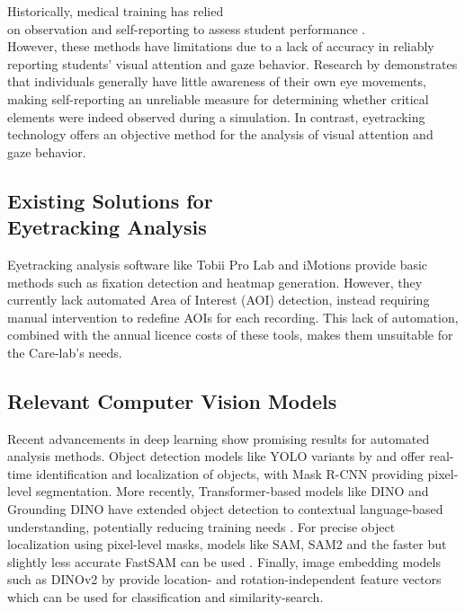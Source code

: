 \documentclass[english]{hogent-article}
\begin{document}
Historically, medical training has relied\\ on observation and self-reporting to assess student performance \autocite{Pauszek2023}.\\
However, these methods have limitations due to a lack of accuracy in reliably reporting students' visual attention and gaze behavior. 
Research by \textcite{Clarke2017} demonstrates that individuals generally have little awareness of their own eye movements, 
making self-reporting an unreliable measure for determining whether critical elements were indeed observed during a simulation. 
In contrast, eyetracking technology offers an objective method for the analysis of visual attention and gaze behavior.

\subsection{Existing Solutions for\\ Eyetracking Analysis}

Eyetracking analysis software like Tobii Pro Lab \textcite{Tobii2025a} and iMotions \textcite{iMotions2025} provide basic methods such as fixation detection and heatmap generation.
However, they currently lack automated Area of Interest (AOI) detection, instead requiring manual intervention to redefine AOIs for each recording.
This lack of automation, combined with the annual licence costs of these tools, makes them unsuitable for the Care-lab's needs.

\subsection{Relevant Computer Vision Models}

Recent advancements in deep learning show promising results for automated analysis methods.
Object detection models like YOLO variants by \textcite{Redmon2016} and \textcite{Khanam2024} 
offer real-time identification and localization of objects, with Mask R-CNN \autocite{He2018} providing pixel-level segmentation.
More recently, Transformer-based models like DINO and Grounding DINO have extended object detection to 
contextual language-based understanding, potentially reducing training needs \autocite{Zhang2022, Liu2023}.
For precise object localization using pixel-level masks, models like SAM, SAM2 and the faster but slightly less 
accurate FastSAM can be used \autocite{Kirillov2023, Ravi2024, Zhao2023}.
Finally, image embedding models such as DINOv2 by \textcite{Oquab2024} provide location- 
and rotation-independent feature vectors which can be used for classification and similarity-search.
\end{document}
